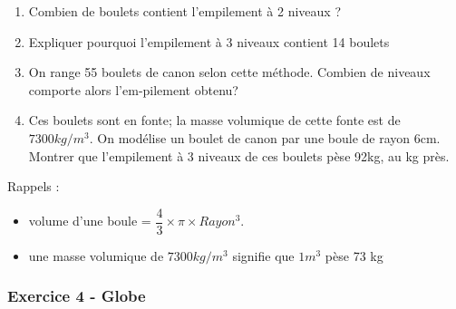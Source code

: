 \documentclass[11pt]{article}
\begin{document}
\begin{enumerate}
\item Combien de boulets contient l’empilement à 2 niveaux ?
\item Expliquer pourquoi l’empilement à 3 niveaux contient 14 boulets
\item On range 55 boulets de canon selon cette méthode. Combien de niveaux comporte alors l’em-pilement obtenu?
\item Ces boulets sont en fonte; la masse volumique de cette fonte est de $7300kg/m^3$. On modélise un boulet de canon par une boule de rayon 6cm. Montrer que l’empilement à 3 niveaux de ces boulets pèse 92kg, au kg près.
\end{enumerate}

Rappels : 

\begin{itemize}
 \item volume d’une boule = $\dfrac{4}{3} \times \pi \times Rayon^3$.
 \item une masse volumique de $7300kg/m^3$ signifie que $1m^3$ pèse 73 kg
\end{itemize}


\subsubsection*{Exercice 4 - Globe}
\end{document}
